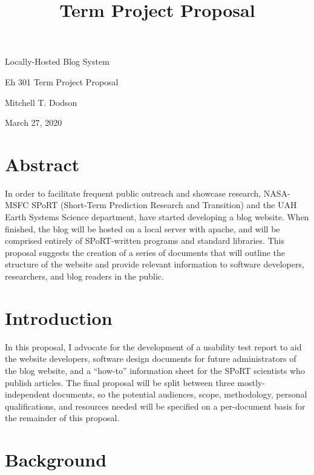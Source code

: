 \documentclass[12pt]{article}
\title{Term Project Proposal}
\begin{document}
\thispagestyle{empty}

\begin{center}\Huge
	\vspace*{3em}
	Locally-Hosted Blog System
\end{center}

\begin{center}\large
	Eh 301 Term Project Proposal

	\vfill
	Mitchell T. Dodson

	March 27, 2020

	\vspace{3em}

\end{center}


\newpage


\section{Abstract}

In order to facilitate frequent public outreach and showcase research, NASA-MSFC SPoRT (Short-Term Prediction Research and Transition) and the UAH Earth Systems Science department, have started developing a blog website. When finished, the blog will be hosted on a local server with apache, and will be comprised entirely of SPoRT-written programs and standard libraries. This proposal suggests the creation of a series of documents that will outline the structure of the website and provide relevant information to software developers, researchers, and blog readers in the public.

\section{Introduction}

In this proposal, I advocate for the development of a usability test report to aid the website developers, software design documents for future administrators of the blog website, and a ``how-to'' information sheet for the SPoRT scientists who publish articles. The final proposal will be split between three mostly-independent documents, so the potential audiences, scope, methodology, personal qualifications, and resources needed will be specified on a per-document basis for the remainder of this proposal.

\section{Background}
\end{document}
